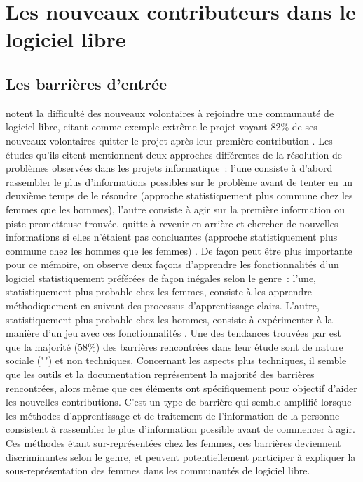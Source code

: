 \section{Les nouveaux contributeurs dans le logiciel libre}

\subsection{Les barrières d'entrée}

 notent la difficulté des nouveaux volontaires à rejoindre une communauté de
logiciel libre, citant comme exemple extrême le projet  voyant 82\% de ses nouveaux
volontaires quitter le projet après leur première contribution . Les études
qu'ils citent mentionnent deux approches différentes de la résolution de problèmes observées dans les projets
informatique : l'une consiste à d'abord rassembler le plus d'informations possibles sur le problème avant de
tenter en un deuxième temps de le résoudre (approche statistiquement plus commune chez les femmes que les
hommes), l'autre consiste à agir sur la première information ou piste prometteuse trouvée, quitte à revenir en
arrière et chercher de nouvelles informations si elles n'étaient pas concluantes (approche statistiquement
plus commune chez les hommes que les femmes)
. De façon peut être plus
importante pour ce mémoire, on observe deux façons d'apprendre les fonctionnalités d'un logiciel
statistiquement préférées de façon inégales selon le genre : l'une, statistiquement plus probable chez les
femmes, consiste à les apprendre méthodiquement en suivant des processus d'apprentissage clairs. L'autre,
statistiquement plus probable chez les hommes, consiste à expérimenter à la manière d'un jeu avec ces
fonctionnalités . Une des tendances trouvées
par \textcite[p.~1008]{barriers-2018} est que la majorité ($58\%$) des barrières rencontrées dans leur étude
sont de nature sociale ("") et non techniques. Concernant les aspects plus techniques,
il semble que les outils et la documentation représentent la majorité des barrières rencontrées, alors même
que ces éléments ont spécifiquement pour objectif d'aider les nouvelles contributions. C'est un type de
barrière qui semble amplifié lorsque les méthodes d'apprentissage et de traitement de l'information de la
personne consistent à rassembler le plus d'information possible avant de commencer à agir. Ces méthodes étant
sur-représentées chez les femmes, ces barrières deviennent discriminantes selon le genre, et peuvent
potentiellement participer à expliquer la sous-représentation des femmes dans les communautés de logiciel
libre.

